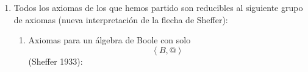 \begin{enumerate}
\begin{enumerate}
\begin{enumerate}
\begin{enumerate}
\begin{enumerate}
          \begin{enumerate}
          \def\labelenumvi{\arabic{enumvi}.}
          \item
            \[\forall x\exists y{{x + y} = 1}\]

            \begin{enumerate}
            \def\labelenumvii{\arabic{enumvii}.}
            \tightlist
            \item
              \[y{: = x}@{x = x}'\]
            \item
              \[{x + x}{' = {({x@x'})}}{' = 0}{' = 1}\]
            \end{enumerate}
          \item
            \[\forall x\exists y{{x \cdot y} = 0}\]

            \begin{enumerate}
            \def\labelenumvii{\arabic{enumvii}.}
            \tightlist
            \item
              \[y{: = x}@{x = x}'\]
            \item
              \[{x \cdot x}{{{' = {x'@x}} = {x@x'}} = 0}\]
            \end{enumerate}
          \end{enumerate}
        \item
          Definición: \[\overline{x} ≝ {x@x}{\equiv}x'\]
        \end{enumerate}
      \end{enumerate}
    \item
      Todos los axiomas de los que hemos partido son reducibles al
      siguiente grupo de axiomas (nueva interpretación de la flecha de
      Sheffer):

      \begin{enumerate}
      \def\labelenumiv{\arabic{enumiv}.}
      \item
        Axiomas para un álgebra de Boole con
        solo\[\left\langle {B,@} \right\rangle\](Sheffer 1933):


\end{enumerate}
\end{enumerate}
\end{enumerate}
\end{enumerate}

